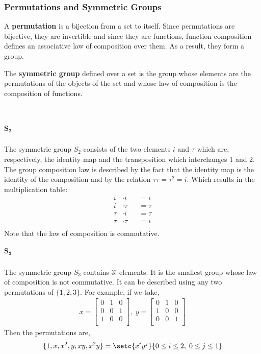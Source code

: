\documentclass[MathsNotesBase.tex]{subfiles}
\begin{document}
{			\subsubsection{Permutations and Symmetric Groups}\bigskip
		\begin{definition}
			A \textbf{permutation} is a bijection from a set to itself. Since permutations are bijective, they are invertible and since they are functions, function composition defines an associative law of composition over them. As a result, they form a group. 
		\end{definition}
		\begin{definition}
			The \textbf{symmetric group} defined over a set is the group whose elements are the permutations of the objects of the set and whose law of composition is the composition of functions.
		\end{definition} 
		\\
		\subparagraph{$\bm{S_2}$}
		The symmetric group $S_2$ consists of the two elements $i$ and $\tau$ which are, respectively, the identity map and the transposition which interchanges 1 and 2. The group composition law is described by the fact that the identity map is the identity of the composition and by the relation $\tau\tau = \tau^2 = i$. Which results in the multiplication table:	
		\[
		\begin{aligned}
			i &\cdot i &&= i \\
			i &\cdot \tau &&= \tau \\		
			\tau &\cdot i &&= \tau \\
			\tau &\cdot \tau &&= i \\
		\end{aligned}
		\]
		Note that the law of composition is commutative.
		\subparagraph{$\bm{S_3}$}
		The symmetric group $S_3$ contains $3!$ elements. It is the smallest group whose law of composition is not commutative. It can be described using any two permutations of $\{1, 2, 3\}$. For example, if we take,
		\begin{align*}
			x =
			\begin{bmatrix}
			0 & 1 & 0 \\
			0 & 0 & 1 \\
			1 & 0 & 0 \\
			\end{bmatrix},\;
			y =
			\begin{bmatrix}
			0 & 1 & 0 \\
			1 & 0 & 0 \\
			0 & 0 & 1 \\
			\end{bmatrix}
		\end{align*}
		Then the permutations are,
		\[ \{1, x, x^2, y, xy, x^2y\} = \setc{x^iy^j}{0 \leq i \leq 2,\; 0 \leq j \leq 1} \]
	}
	
\end{document}
